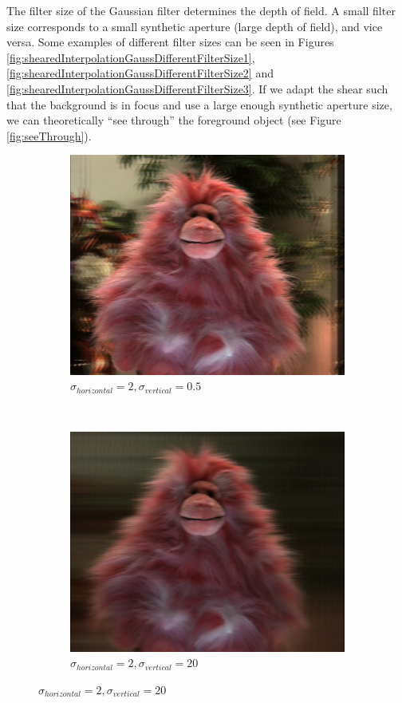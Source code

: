 \documentclass[a4paper]{article}
\begin{document}
The filter size of the Gaussian filter determines the depth of field. A small filter size corresponds to a small synthetic aperture (large depth of field), and vice versa. Some examples of different filter sizes can be seen in Figures \ref{fig:shearedInterpolationGaussDifferentFilterSize1}, \ref{fig:shearedInterpolationGaussDifferentFilterSize2} and \ref{fig:shearedInterpolationGaussDifferentFilterSize3}. If we adapt the shear such that the background is in focus and use a large enough synthetic aperture size, we can theoretically ``see through'' the foreground object (see Figure \ref{fig:seeThrough}).
\begin{figure}[ht]
	\begin{subfigure}[h]{0.48\textwidth}
	  \includegraphics[width=\textwidth]{shearedGauss_k1_shear16_sighor2_sigvert0-5}
	  \caption*{$\sigma_{horizontal} = 2, \sigma_{vertical} = 0.5$}
	\end{subfigure}
    	~
	\begin{subfigure}[h]{0.48\textwidth}
	  \includegraphics[width=\textwidth]{shearedGauss_k1_shear16_sighor2_sigvert20}
	  \caption*{$\sigma_{horizontal} = 2, \sigma_{vertical} = 20$}
	\end{subfigure}
	

\end{figure}
\end{document}
